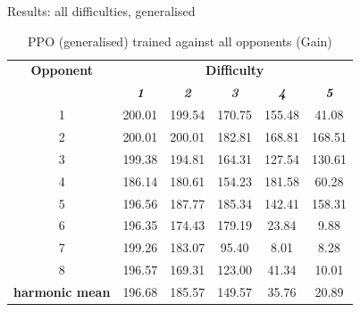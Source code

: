 \documentclass[boxes]{beamer}
\begin{document}
\begin{frame}{Results: all difficulties, generalised}
  \begin{table}[htbp]
        \caption{PPO (generalised) trained against all opponents (Gain)}
        \begin{center}
            \begin{tabular}{|c|c|c|c|c|c|}
                \hline
                \textbf{Opponent}&\multicolumn{5}{|c|}{\textbf{Difficulty}} \\
                \cline{2-6}
                & \textbf{\textit{1}}& \textbf{\textit{2}}& \textbf{\textit{3}} & \textbf{\textit{4}} & \textbf{\textit{5}} \\
                \hline
                 1 &  200.01 &  199.54 &  170.75 &  155.48 &   41.08\\
                 2 &  200.01 &  200.01 &  182.81 &  168.81 &  168.51\\
                 3 &  199.38 &  194.81 &  164.31 &  127.54 &  130.61\\
                 4 &  186.14 &  180.61 &  154.23 &  181.58 &   60.28\\
                 5 &  196.56 &  187.77 &  185.34 &  142.41 &  158.31\\
                 6 &  196.35 &  174.43 &  179.19 &   23.84 &    9.88\\
                 7 &  199.26 &  183.07 &   95.40 &    8.01 &    8.28\\
                 8 &  196.57 &  169.31 &  123.00 &   41.34 &   10.01\\
                \hline
                \textbf{harmonic mean} & 196.68 & 185.57 & 149.57 & 35.76 & 20.89 \\
                \hline
            \end{tabular}
            \label{PPO against all opponents gain}
        \end{center}
    \end{table}
\end{frame}
\end{document}
